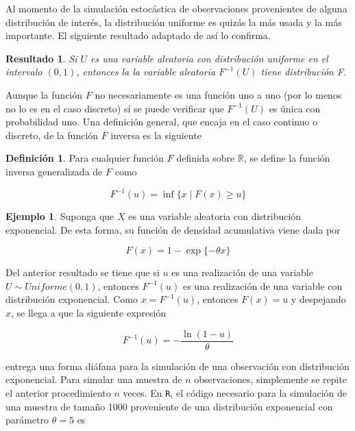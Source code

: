 \documentclass[
  10pt,
  spanish,
]{book}
\newtheorem{proposition}{Resultado}[chapter]
\theoremstyle{definition}
\newtheorem{definition}{Definición}[chapter]
\theoremstyle{definition}
\newtheorem{example}{Ejemplo}[chapter]
\theoremstyle{definition}
\theoremstyle{definition}
\theoremstyle{remark}
\begin{document}
Al momento de la simulación estocástica de observaciones provenientes de alguna distribución de interés, la distribución uniforme es quizás la más usada y la más importante. El siguiente resultado adaptado de \citet{Casella} así lo confirma.

\begin{proposition}
\protect\hypertarget{prp:unnamed-chunk-2}{}{\label{prp:unnamed-chunk-2} }Si \(U\) es una variable aleatoria con distribución uniforme en el intervalo \((0,1)\), entonces la la variable aleatoria \(F^{-1}(U)\) tiene distribución F.
\end{proposition}

Aunque la función \(F\) no necesariamente es una función uno a uno (por lo menos no lo es en el caso discreto) sí se puede verificar que \(F^{-1}(U)\) es única con probabilidad uno. Una definición general, que encaja en el caso continuo o discreto, de la función \(F\) inversa es la siguiente

\begin{definition}
\protect\hypertarget{def:unnamed-chunk-3}{}{\label{def:unnamed-chunk-3} }Para cualquier función \(F\) definida sobre \(\mathbb{R}\), se define la función inversa generalizada de \(F\) como

\begin{equation}
F^{-1}(u)=\inf \{x \mid F(x)\geq u\}
\end{equation}
\end{definition}

\begin{example}
\protect\hypertarget{exm:unnamed-chunk-4}{}{\label{exm:unnamed-chunk-4} }Suponga que \(X\) es una variable aleatoria con distribución exponencial. De esta forma, su función de densidad acumulativa viene dada por

\begin{equation*}
F(x)=1-\exp\{ -\theta x\}
\end{equation*}

Del anterior resultado se tiene que si \(u\) es una realización de una variable \(U \sim Uniforme(0,1)\), entonces \(F^{-1}(u)\) es una realización de una variable con distribución exponencial. Como \(x=F^{-1}(u)\), entonces \(F(x)=u\) y despejando \(x\), se llega a que la siguiente expresión

\begin{equation*}
F^{-1}(u)=-\frac{\ln(1-u)}{\theta}
\end{equation*}

entrega una forma diáfana para la simulación de una observación con distribución exponencial. Para simular una muestra de \(n\) observaciones, simplemente se repite el anterior procedimiento \(n\) veces. En \texttt{R}, el código necesario para la simulación de una muestra de tamaño 1000 proveniente de una distribución exponencial con parámetro \(\theta=5\) es
\end{example}
\end{document}
